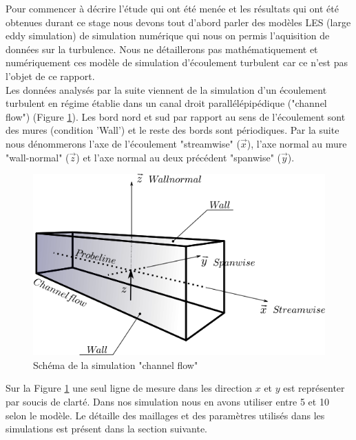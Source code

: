 \documentclass[12pt]{article}
\theoremstyle{plain}
\theoremstyle{remark}
\newcommand{\vect}{\overrightarrow}
\begin{document}
Pour commencer à décrire l'étude qui ont été menée et les résultats qui ont été obtenues durant ce stage nous devons tout d'abord parler des modèles LES (large eddy simulation) de simulation numérique qui nous on permis l'aquisition de données sur la turbulence. Nous ne détaillerons pas mathématiquement et numériquement ces modèle de simulation d'écoulement turbulent car ce n'est pas l'objet de ce rapport. \\

Les données analysés par la suite viennent de la simulation d'un écoulement turbulent en régime établie dans un canal droit parallélépipédique ("channel flow") (Figure \ref{fig:channel_flow}). Les bord nord et sud par rapport au sens de l'écoulement sont des mures (condition 'Wall') et le reste des bords sont périodiques. Par la suite nous dénommerons l'axe de l'écoulement "streamwise" ($\vect{x}$), l'axe normal au mure "wall-normal" ($\vect{z}$) et l'axe normal au deux précédent "spanwise" ($\vect{y}$). \\

\begin{figure}[h!]
	\begin{center}
		\includegraphics[width=0.62\linewidth]{../../report/referance/channel_flow.png}
		\caption{Schéma de la simulation "channel flow"}
		\label{fig:channel_flow}
	\end{center}
\end{figure}

Sur la Figure \ref{fig:channel_flow} une seul ligne de mesure dans les direction $x$ et $y$ est représenter par soucis de clarté. Dans nos simulation nous en avons utiliser entre 5 et 10 selon le modèle. Le détaille des maillages et des paramètres utilisés dans les simulations est présent dans la section suivante. \\
\end{document}
